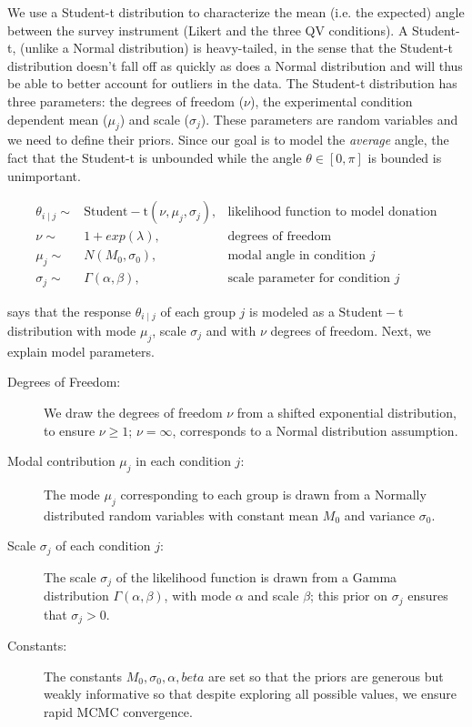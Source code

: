 We use a Student-t distribution to characterize the mean (i.e. the expected) angle between the survey instrument (Likert and the three QV conditions). A Student-t, (unlike a Normal distribution) is heavy-tailed, in the sense that the Student-t distribution doesn't fall off as quickly as does a Normal distribution and will thus be able to better account for outliers in the data. The Student-t distribution has three parameters: the degrees of freedom ($\nu$), the experimental condition dependent mean ($\mu_j$) and scale ($\sigma_j$).  These parameters are random variables and we need to define their priors. Since our goal is to model the \textit{average} angle, the fact that the Student-t is unbounded while the angle $\theta \in [0, \pi]$ is bounded is unimportant.

\begin{align}
  \theta_{i \mid j} \sim & \mathrm{Student-t}(\nu, \mu_j, \sigma_j),   & \text{likelihood function to model donation} \label{eq:bayesian formulation} \\
  \nu \sim & 1 + exp(\lambda), & \text{degrees of freedom} \\
  \mu_j \sim & N(M_0, \sigma_0), & \text{modal angle in condition } j \\
  \sigma_j \sim & \Gamma(\alpha, \beta), & \text{scale parameter for condition } j
\end{align}
 
 says that the response $\theta_{i \mid j}$ of each group $j$ is modeled as a $\mathrm{Student-t}$ distribution with mode $\mu_j$,  scale $\sigma_j$ and with $\nu$ degrees of freedom. Next, we explain model parameters.


\begin{description}
    \item[Degrees of Freedom:] We draw the degrees of freedom $\nu$ from a shifted exponential distribution, to ensure $\nu \geq 1$; $\nu=\infty$, corresponds to a Normal distribution assumption.
    \item[Modal contribution $\mu_j$ in each condition $j$:] The mode $\mu_j$ corresponding to each group is drawn from a Normally distributed random variables with constant mean $M_0$ and variance $\sigma_0$. 
    \item[Scale $\sigma_j$ of each condition $j$:]  The scale $\sigma_j$ of the likelihood function is drawn from a Gamma distribution $\Gamma(\alpha, \beta)$, with mode $\alpha$ and scale $\beta$; this prior on $\sigma_j$ ensures that $\sigma_j > 0$. 
    \item[Constants:] The constants $M_0, \sigma_0, \alpha, beta$ are set so that the priors are generous but weakly informative so that despite exploring all possible values, we ensure rapid MCMC convergence.
\end{description}


